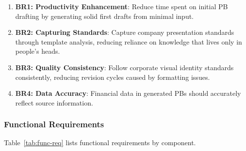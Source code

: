 \begin{enumerate}
    \item \textbf{BR1: Productivity Enhancement}: Reduce time spent on initial PB drafting by generating solid first drafts from minimal input.
    \item \textbf{BR2: Capturing Standards}: Capture company presentation standards through template analysis, reducing reliance on knowledge that lives only in people's heads.
    \item \textbf{BR3: Quality Consistency}: Follow corporate visual identity standards consistently, reducing revision cycles caused by formatting issues.
    \item \textbf{BR4: Data Accuracy}: Financial data in generated PBs should accurately reflect source information.
\end{enumerate}

\subsubsection{Functional Requirements}

Table~\ref{tab:func-req} lists functional requirements by component.

